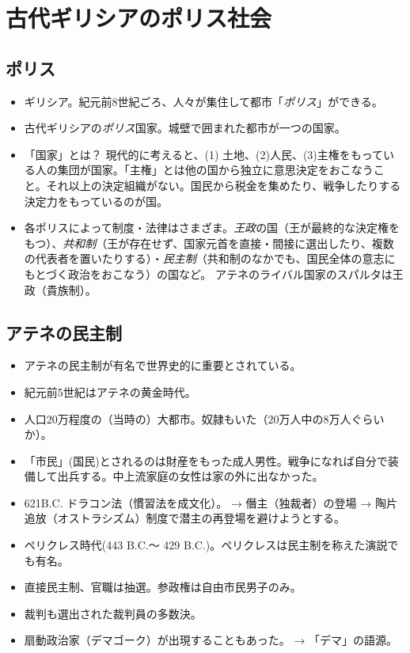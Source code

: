 \documentclass[uplatex,dvipdfmx]{jsarticle} \usepackage{mystyle}%
\begin{document}
\section{古代ギリシアのポリス社会}

\subsection{ポリス}

\begin{itemize}
\item ギリシア。紀元前8世紀ごろ、人々が集住して都市「\emph{ポリス}」ができる。
\item 古代ギリシアの\emph{ポリス}国家。城壁で囲まれた都市が一つの国家。
\item 「国家」とは？ 現代的に考えると、(1) 土地、(2)人民、(3)主権をもっている人の集団が国家。「主権」とは他の国から独立に意思決定をおこなうこと。それ以上の決定組織がない。国民から税金を集めたり、戦争したりする決定力をもっているのが国。
\item 各ポリスによって制度・法律はさまざま。\emph{王政}の国（王が最終的な決定権をもつ）、\emph{共和制}（王が存在せず、国家元首を直接・間接に選出したり、複数の代表者を置いたりする）・\emph{民主制}（共和制のなかでも、国民全体の意志にもとづく政治をおこなう）の国など。
アテネのライバル国家のスパルタは王政（貴族制）。

\end{itemize}

\subsection{アテネの民主制}
\begin{itemize}
\item アテネの民主制が有名で世界史的に重要とされている。
\item 紀元前5世紀はアテネの黄金時代。
\item 人口20万程度の（当時の）大都市。奴隷もいた（20万人中の8万人ぐらいか）。
\item 「市民」(国民)とされるのは財産をもった成人男性。戦争になれば自分で装備して出兵する。中上流家庭の女性は家の外に出なかった。
\item 621B.C. ドラコン法（慣習法を成文化）。
→ 僭主（独裁者）の登場 → 陶片追放（オストラシズム）制度で潜主の再登場を避けようとする。
\item ペリクレス時代(443 B.C.〜 429 B.C.)。ペリクレスは民主制を称えた演説でも有名。
\item 直接民主制、官職は抽選。参政権は自由市民男子のみ。
\item 裁判も選出された裁判員の多数決。
\item 扇動政治家（デマゴーク）が出現することもあった。 → 「デマ」の語源。
\end{itemize}
\end{document}
